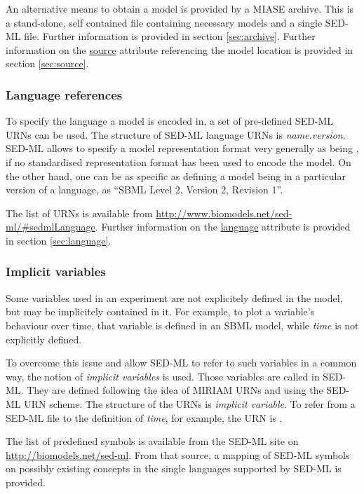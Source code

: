 An alternative means to obtain a model is provided by a MIASE archive. This is a stand-alone, self contained file containing necessary models and a single SED-ML file.  Further information is provided in section \ref{sec:archive}.
Further information on the \hyperref[sec:source]{source} attribute referencing the model location is provided in section \ref{sec:source}.

\subsubsection{Language references}
\label{sec:languageURI}
To specify the language a model is encoded in, a set of pre-defined SED-ML URNs can be used. 
The structure of SED-ML language URNs is \emph{name.version}. 
SED-ML allows to specify a model representation format very generally as being , if no standardised representation format has been used to encode the model. On the other hand, one can be as specific as defining
a model being in a particular version of a language, as ``SBML Level 2, Version 2, Revision 1''.

The list of URNs is available from \url{http://www.biomodels.net/sed-ml/#sedmlLanguage}. 
Further information on the \hyperref[sec:language]{language} attribute is provided in section \ref{sec:language}.

\subsubsection{Implicit variables}
\label{sec:implicitVariable}

Some variables used in an experiment are not explicitely defined in the model, but may be implicitely contained in it. 
For example, to plot a variable's behaviour over time, that variable is defined in an SBML model, while \emph{time} is not explicitly defined. 

To overcome this issue and allow SED-ML to refer to such variables in a common way, the notion of \emph{implicit variables} is used.
Those variables are called  in SED-ML. They are defined following the idea of MIRIAM URNs and using the SED-ML URN scheme. The structure of the URNs is \emph{implicit variable}.
To refer from a SED-ML file to the definition of \emph{time}, for example, the URN is .

The list of predefined symbols is available from the SED-ML site on \url{http://biomodels.net/sed-ml}.
From that source, a mapping of SED-ML symbols on possibly existing concepts in the single languages supported by SED-ML is provided.

